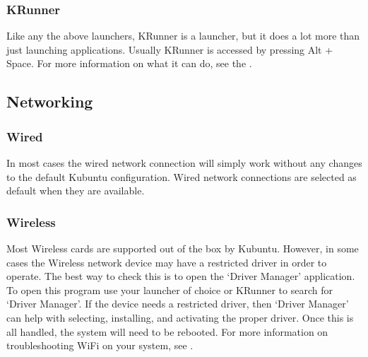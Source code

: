 \documentclass[letterpaper,10pt,english]{sphinxmanual}
\begin{document}
\subsubsection{KRunner}
\label{\detokenize{docs/desktop-guide/basic:krunner}}

\sphinxAtStartPar
Like any the above launchers, KRunner is a launcher, but it does a lot more than just launching applications. Usually KRunner is accessed by pressing Alt + Space. For more information on what it can do, see the .


\subsection{Networking}
\label{\detokenize{docs/desktop-guide/basic:networking}}


\subsubsection{Wired}
\label{\detokenize{docs/desktop-guide/basic:wired}}
\sphinxAtStartPar
In most cases the wired network connection will simply work without any changes to the default Kubuntu configuration. Wired network connections are selected as default when they are available.


\subsubsection{Wireless}
\label{\detokenize{docs/desktop-guide/basic:wireless}}
\sphinxAtStartPar
Most Wireless cards are supported out of the box by Kubuntu. However, in some cases the Wireless network device may have a restricted driver in order to operate. The best way to check this is to open the ‘Driver Manager’ application. To open this program use your launcher of choice or KRunner to search for ‘Driver Manager’. If the device needs a restricted driver, then ‘Driver Manager’ can help with selecting, installing, and activating the proper driver. Once this is all handled, the system will need to be rebooted. For more information on troubleshooting Wi\sphinxhyphen{}Fi on your system, see .
\end{document}
